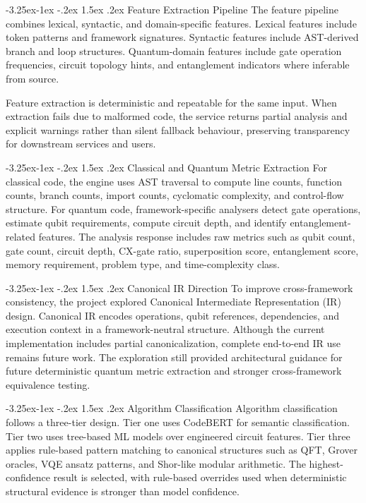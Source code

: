 \documentclass[12pt,a4paper]{report}
\makeatletter
\renewcommand\subsection{\@startsection{subsection}{2}{\z@}%
  {-3.25ex\@plus -1ex \@minus -.2ex}%
  {1.5ex \@plus .2ex}%
  {\normalfont\bfseries\fontsize{12pt}{16pt}\selectfont}}
\makeatother
\begin{document}
\subsection{Feature Extraction Pipeline}
The feature pipeline combines lexical, syntactic, and domain-specific features. Lexical features include token patterns and framework signatures. Syntactic features include AST-derived branch and loop structures. Quantum-domain features include gate operation frequencies, circuit topology hints, and entanglement indicators where inferable from source.

Feature extraction is deterministic and repeatable for the same input. When extraction fails due to malformed code, the service returns partial analysis and explicit warnings rather than silent fallback behaviour, preserving transparency for downstream services and users.

\subsection{Classical and Quantum Metric Extraction}
For classical code, the engine uses AST traversal to compute line counts, function counts, branch counts, import counts, cyclomatic complexity, and control-flow structure. For quantum code, framework-specific analysers detect gate operations, estimate qubit requirements, compute circuit depth, and identify entanglement-related features. The analysis response includes raw metrics such as qubit count, gate count, circuit depth, CX-gate ratio, superposition score, entanglement score, memory requirement, problem type, and time-complexity class.

\subsection{Canonical IR Direction}
To improve cross-framework consistency, the project explored Canonical Intermediate Representation (IR) design. Canonical IR encodes operations, qubit references, dependencies, and execution context in a framework-neutral structure. Although the current implementation includes partial canonicalization, complete end-to-end IR use remains future work. The exploration still provided architectural guidance for future deterministic quantum metric extraction and stronger cross-framework equivalence testing.

\subsection{Algorithm Classification}
Algorithm classification follows a three-tier design. Tier one uses CodeBERT for semantic classification. Tier two uses tree-based ML models over engineered circuit features. Tier three applies rule-based pattern matching to canonical structures such as QFT, Grover oracles, VQE ansatz patterns, and Shor-like modular arithmetic. The highest-confidence result is selected, with rule-based overrides used when deterministic structural evidence is stronger than model confidence.
\end{document}
